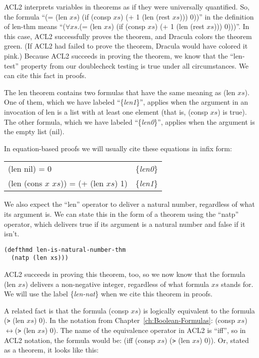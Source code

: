 ACL2 interprets variables in theorems as if they were universally quantified. So, the formula ``(= (len $xs$) (if (consp $xs$) (+ 1 (len (rest $xs$))) 0))'' in the definition of len-thm means ``($\forall$$xs$.(= (len $xs$) (if (consp $xs$) (+ 1 (len (rest $xs$))) 0)))''.
In this case, ACL2 successfully proves the theorem, and Dracula colors the theorem green. (If ACL2 had failed to prove the theorem, Dracula would have colored it pink.) Because ACL2 succeeds in proving the theorem, we know that the ``len-test'' property from our doublecheck testing is true under all circumstances. We can cite this fact in proofs.

The len theorem contains two formulas that have the same meaning as (len $xs$). One of them, which we have labeled ``\{\emph{len1}\}'', applies when the argument in an invocation of len is a list with at least one element (that is, (consp $xs$) is true).  The other formula, which we have labeled ``\{\emph{len0}\}'', applies when the argument is the empty list (nil).

In equation-based proofs we will usually cite these equations in infix form:

\label{len-equations}
\begin{center}
\begin{tabular}{ll}
(len nil) = 0                            & \{\emph{len0}\} \\
(len (cons $x$ $xs$)) = (+ (len $xs$) 1) & \{\emph{len1}\}
\end{tabular}
\end{center}

We also expect the ``len'' operator to deliver a natural number, regardless of what its argument is. We can state this in the form of a theorem using the ``natp'' operator, which delivers true if its argument is a natural number and false if it isn't.

\label{len-nat-thm}
\begin{lstlisting}
(defthmd len-is-natural-number-thm
  (natp (len xs)))
\end{lstlisting}

ACL2 succeeds in proving this theorem, too, so we now know that the formula (len $xs$) delivers a non-negative integer, regardless of what formula $xs$ stands for. We will use the label \{\emph{len-nat}\} when we cite this theorem in proofs.

A related fact is that the formula (consp $xs$) is logically equivalent to the formula (\verb+>+ (len $xs$) 0). In the notation from Chapter~\ref{ch:Boolean-Formulas}: (consp $xs$)$\leftrightarrow$(\verb+>+ (len $xs$) 0). The name of the equivalence operator in ACL2 is ``iff'', so in ACL2 notation, the formula would be:
(iff (consp $xs$) (\verb+>+ (len $xs$) 0)). Or, stated as a theorem, it looks like this:

